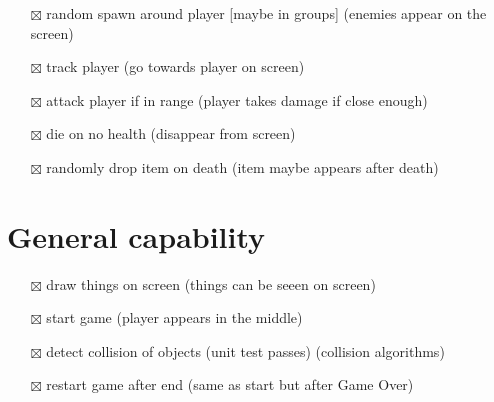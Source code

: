 \documentclass[
]{article}
\providecommand{\tightlist}{%
  \setlength{\itemsep}{0pt}\setlength{\parskip}{0pt}}
\begin{document}
\begin{itemize}
\tightlist
\item[$\boxtimes$]
  random spawn around player {[}maybe in groups{]} (enemies appear on
  the screen)
\item[$\boxtimes$]
  track player (go towards player on screen)
\item[$\boxtimes$]
  attack player if in range (player takes damage if close enough)
\item[$\boxtimes$]
  die on no health (disappear from screen)
\item[$\boxtimes$]
  randomly drop item on death (item maybe appears after death)
\end{itemize}

\section{General capability}\label{general-capability}

\begin{itemize}
\tightlist
\item[$\boxtimes$]
  draw things on screen (things can be seeen on screen)
\item[$\boxtimes$]
  start game (player appears in the middle)
\item[$\boxtimes$]
  detect collision of objects (unit test passes) (collision algorithms)
\item[$\boxtimes$]
  restart game after end (same as start but after Game Over)
\end{itemize}
\end{document}
